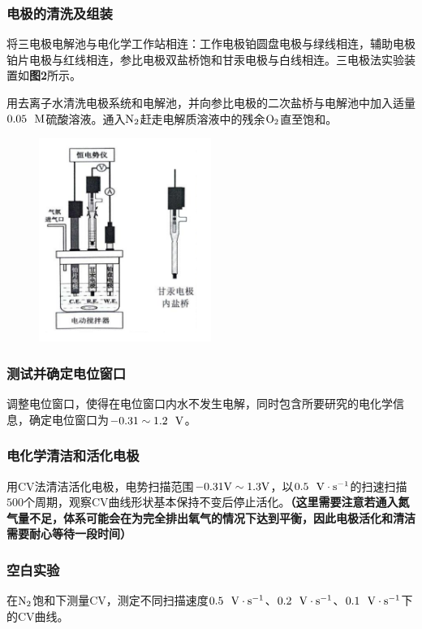 \documentclass[12pt]{article}
\begin{document}
		\subsubsection{电极的清洗及组装}
			将三电极电解池与电化学工作站相连：工作电极铂圆盘电极与绿线相连，辅助电极铂片电极与红线相连，参比电极双盐桥饱和甘汞电极与白线相连。三电极法实验装置如\textbf{图2}所示。\par
			用去离子水清洗电极系统和电解池，并向参比电极的二次盐桥与电解池中加入适量$0.05 \ \ {\rm M}$硫酸溶液。通入$\rm N_{2}$赶走电解质溶液中的残余$\rm O_{2}$直至饱和。\par
			 \begin{figure}[!h]
				\centering
				\includegraphics[width=0.5\textwidth]{2.png}
			\end{figure}
		\subsubsection{测试并确定电位窗口}
			调整电位窗口，使得在电位窗口内水不发生电解，同时包含所要研究的电化学信息，确定电位窗口为$-0.31\sim 1.2\ \ {\rm V}$。\par
		\subsubsection{电化学清洁和活化电极}
		 	用CV法清洁活化电极，电势扫描范围$-0.31\rm{V}\sim 1.3\rm{V}$，以$0.5\ \ {\rm V\cdot s^{-1}}$的扫速扫描$500$个周期，观察CV曲线形状基本保持不变后停止活化。\textbf{（这里需要注意若通入氮气量不足，体系可能会在为完全排出氧气的情况下达到平衡，因此电极活化和清洁需要耐心等待一段时间）}\par
		\subsubsection{空白实验}
			在$\rm N_{2}$饱和下测量CV，测定不同扫描速度$0.5\ \ {\rm V\cdot s^{-1}}$、$0.2\ \ {\rm V\cdot s^{-1}}$、$0.1\ \ {\rm V\cdot s^{-1}}$下的CV曲线。\par
\end{document}
